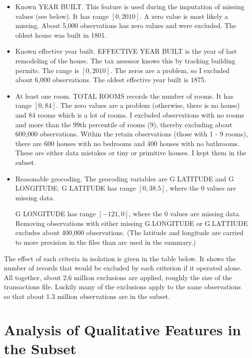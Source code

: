 \begin{itemize}
\item Known YEAR BUILT. This feature is used during the imputation of
  missing values (see below). It has range $[0, 2010]$. A zero value
  is most likely a missing. About 5,000 observations has zero values
  and  were excluded. The oldest house was built in 1801.

\item Known effective year built. EFFECTIVE YEAR BUILT is the year of
  last remodeling of the house. The tax assessor knows this by
  tracking building permits. The range is $[0, 2010]$. The zeros are a
  problem, so I excluded about 6,000 observations. The oldest
  effective year built is 1875.

\item At least one room. TOTAL ROOMS records the number of rooms. It
  has range $[0, 84]$. The zero values are a problem (otherwise, there
  is no house) and 84 rooms which is a lot of rooms. I excluded observations
  with no rooms and more than the 99th percentile of rooms (9),
  thereby excluding about 600,000 observations. Within the retain
  observations (those with 1 - 9 rooms), there are 600 houses with no
  bedrooms and 400 houses with no bathrooms. These are either data
  mistakes or tiny or primitive houses. I kept them in the subset.

\item Reasonable geocoding. The geocoding variables are G LATITUDE and
  G LONGITUDE. G LATITUDE has range $[0, 38.5]$, where the 0 values
  are missing data.

  G LONGITUDE has range $[-121,0]$, where the 0 values are
  missing data. Removing observations with either missing G.LONGITUDE
  or G.LATTIUDE  excludes about 400,000
  observations. (The latitude and longitude are carried to more
  precision in the files than are used in the summary.)

\end{itemize}

The effect of each criteria in isolation is given in the table
below. It shows the number of records that would be excluded by each
criterion if it operated alone. All together, about 2.6 million
exclusions are applied, roughly the size of the transactions
file. Luckily many of the exclusions apply to the same observations so
that about 1.3 million observations are in the subset.




\section{Analysis of Qualitative Features in the Subset}

